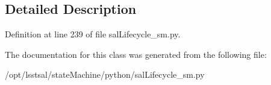 \subsection{Detailed Description}


Definition at line 239 of file sal\-Lifecycle\-\_\-sm.\-py.



The documentation for this class was generated from the following file\-:\begin{DoxyCompactItemize}
\item 
/opt/lsstsal/state\-Machine/python/sal\-Lifecycle\-\_\-sm.\-py\end{DoxyCompactItemize}
